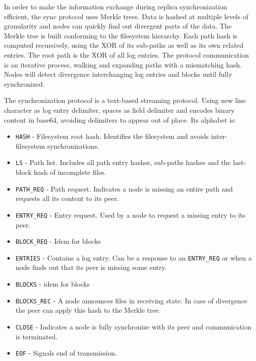 \documentclass{sig-alternate}
\begin{document}

In order to make the information exchange during replica synchronization efficient, the sync protocol uses Merkle trees. Data is hashed at multiple levels of granularity and nodes can quickly find out divergent parts of the data. The Merkle tree is built conforming to the filesystem hierarchy. Each path hash is computed recursively, using the XOR of its sub-paths as well as its own related entries. The root path is the XOR of all log entries. The protocol communication is an iterative process, walking and expanding paths with a mismatching hash. Nodes will detect divergence interchanging log entries and blocks until fully synchronized. 

The synchronization protocol is a text-based streaming protocol. Using new line character as log entry delimiter, spaces as field delimiter and encodes binary content in base64, avoiding delimiters to appear out of place. Its alphabet is:

\begin{itemize}
\item \texttt{HASH} - Filesystem root hash. Identifies the filesystem and avoids inter-filesystem synchronizations. 
\item \texttt{LS} - Path list. Includes all path entry hashes, sub-paths hashes and the last-block hash of incomplete files.
\item \texttt{PATH\_REQ} - Path request. Indicates a node is missing an entire path and requests all its content to its peer.
\item \texttt{ENTRY\_REQ} - Entry request. Used by a node to request a missing entry to its peer.
\item \texttt{BLOCK\_REQ} - Idem for blocks
\item \texttt{ENTRIES} - Contains a log entry. Can be a response to an \texttt{ENTRY\_REQ} or when a node finds out that its peer is missing some entry.
\item \texttt{BLOCKS} - idem for blocks
\item \texttt{BLOCKS\_REC} - A node announces files in receiving state. In case of divergence the peer can apply this hash to the Merkle tree.
\item \texttt{CLOSE} - Indicates a node is fully synchronize with its peer and communication is terminated.
\item \texttt{EOF} - Signals end of transmission.
\end{itemize}
\end{document}
